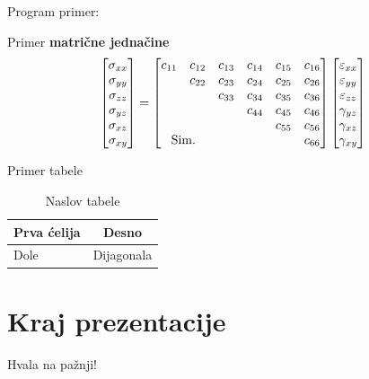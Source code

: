 \documentclass[12pt]{beamer}
\begin{document}
\begin{frame}{}


Program primer:


Primer \textbf{matrične jednačine} %
\footnotesize
\begin{equation}
    \begin{bmatrix}
       \sigma_{xx} \\
       \sigma_{yy} \\
       \sigma_{zz} \\
       \sigma_{yz} \\
       \sigma_{xz} \\
       \sigma_{xy} \\
    \end{bmatrix} 
     = 
    \begin{bmatrix}
       c_{11} & c_{12} & c_{13} & c_{14} & c_{15} & c_{16} \\
       & c_{22} & c_{23} & c_{24} & c_{25} & c_{26} \\
       & & c_{33} & c_{34} & c_{35} & c_{36} \\
       & & & c_{44} & c_{45} & c_{46} \\
       & & & & c_{55} & c_{56} \\
       \multicolumn{2}{c}{\text{Sim.}} & & & & c_{66} \\
    \end{bmatrix} 
    \begin{bmatrix}
       \varepsilon_{xx} \\
       \varepsilon_{yy} \\
       \varepsilon_{zz} \\
       \gamma_{yz} \\
       \gamma_{xz} \\
       \gamma_{xy} \\
    \end{bmatrix} 
\end{equation}

\end{frame}

\begin{frame}{}

Primer tabele

\begin{table}[H]
\large
\centering
\caption{Naslov tabele}
\begin{tabular}[H]{|l|c|}
\hline
Prva ćelija & Desno \\ \hline
Dole & Dijagonala \\ \hline
\end{tabular}
\end{table}
\end{frame}

\section{Kraj prezentacije}
\begin{frame}
\centering
\Huge Hvala na pažnji!
\end{frame}

\end{document}
